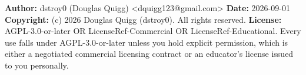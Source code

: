 \medskip

\textbf{Author:} dstroy0 (Douglas Quigg) <dquigg123@gmail.com> \textbf{Date:} 2026-09-01 \textbf{Copyright:} (c) 2026 Douglas Quigg (dstroy0). All rights reserved. \textbf{License:} AGPL-3.0-or-later OR LicenseRef-Commercial OR LicenseRef-Educational. Every use falls under AGPL-3.0-or-later unless you hold explicit permission, which is either a negotiated commercial licensing contract or an educator's license issued to you personally.

